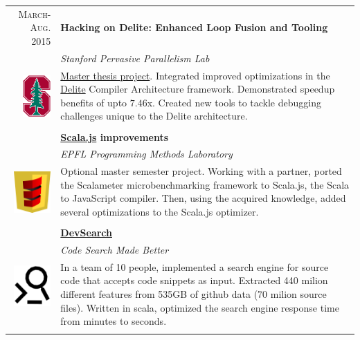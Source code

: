\documentclass[a4paper,11pt]{article} %
\begin{document}
\begin{tabularx}{\textwidth}{r|X}

\textsc{March-Aug. 2015} & \textbf{Hacking on Delite: Enhanced Loop Fusion and Tooling} \\
\multirow{4}{*}{ \includegraphics[width=30pt]{img/stanford.eps}}
& \emph{Stanford Pervasive Parallelism Lab}\\ 
& \footnotesize{\href{https://github.com/paullepoulpe/master-thesis}{Master thesis project}. Integrated improved optimizations in the
\href{http://stanford-ppl.github.io/Delite/index.html}{Delite} Compiler Architecture 
framework. Demonstrated speedup benefits of upto $7.46$x. Created new tools to
tackle debugging challenges unique to the Delite architecture.}\\
\multicolumn{2}{c}{} \\

\textsc{Sep.-Dec. 2015} & \textbf{\href{http://www.scala-js.org/}{Scala.js} improvements} \\
\multirow{4}{*}{ \includegraphics[width=40pt]{img/scala-js.eps}}
& \emph{EPFL Programming Methods Laboratory}\\ 
& \footnotesize{Optional master semester project. Working with a partner, 
 ported the Scalameter microbenchmarking framework to Scala.js, the Scala 
to JavaScript compiler. Then, using the acquired knowledge,
added several optimizations to the Scala.js optimizer.}\\
\multicolumn{2}{c}{} \\

\textsc{Feb.-June 2015} & \textbf{\href{http://doc.devsearch.ch/}{DevSearch}} \\
\multirow{4}{*}{ \includegraphics[width=40pt]{img/devsearch.eps}}
& \emph{Code Search Made Better}\\ 
& \footnotesize{In a team of 10 people, implemented a search engine for source code 
that accepts code snippets as input. Extracted 440 milion different features from 535GB 
of github data (70 milion source files). Written in scala, optimized the search engine 
response time from minutes to seconds.}\\
\multicolumn{2}{c}{} \\


\end{tabularx}
\end{document}

